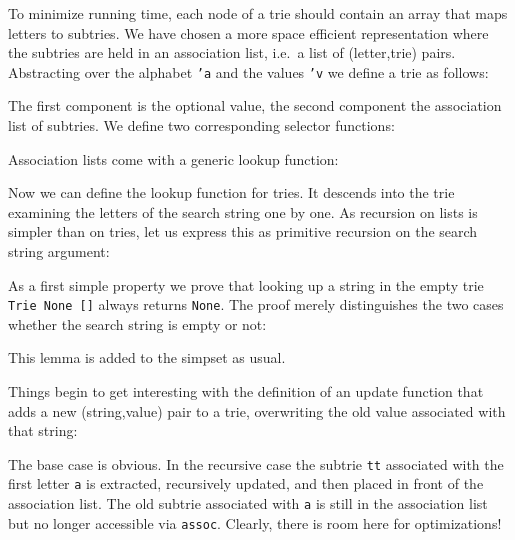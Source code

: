 To minimize running time, each node of a trie should contain an array that maps
letters to subtries. We have chosen a more space efficient representation
where the subtries are held in an association list, i.e.\ a list of
(letter,trie) pairs.  Abstracting over the alphabet \texttt{'a} and the
values \texttt{'v} we define a trie as follows:
\begin{ttbox}
\end{ttbox}
The first component is the optional value, the second component the
association list of subtries. We define two corresponding selector functions:
\begin{ttbox}
\end{ttbox}
Association lists come with a generic lookup function:
\begin{ttbox}
\end{ttbox}

Now we can define the lookup function for tries. It descends into the trie
examining the letters of the search string one by one. As
recursion on lists is simpler than on tries, let us express this as primitive
recursion on the search string argument:
\begin{ttbox}
\end{ttbox}
As a first simple property we prove that looking up a string in the empty
trie \texttt{Trie~None~[]} always returns \texttt{None}. The proof merely
distinguishes the two cases whether the search string is empty or not:
\begin{ttbox}
\end{ttbox}
This lemma is added to the simpset as usual.

Things begin to get interesting with the definition of an update function
that adds a new (string,value) pair to a trie, overwriting the old value
associated with that string:
\begin{ttbox}
\end{ttbox}
The base case is obvious. In the recursive case the subtrie
\texttt{tt} associated with the first letter \texttt{a} is extracted,
recursively updated, and then placed in front of the association list.
The old subtrie associated with \texttt{a} is still in the association list
but no longer accessible via \texttt{assoc}. Clearly, there is room here for
optimizations!

